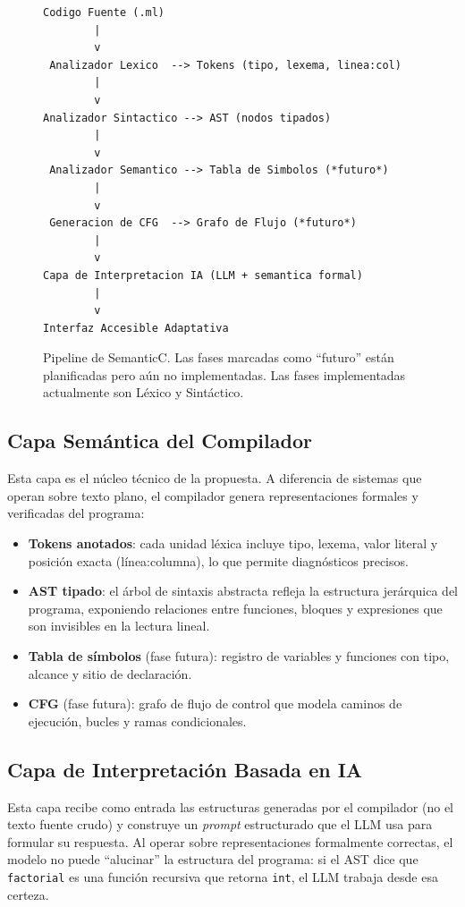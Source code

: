 \documentclass[conference]{IEEEtran}
\begin{document}
\begin{figure}[h]
\centering
\begin{lstlisting}[language={},frame=single,numbers=none,basicstyle=\ttfamily\scriptsize]
Codigo Fuente (.ml)
        |
        v
 Analizador Lexico  --> Tokens (tipo, lexema, linea:col)
        |
        v
Analizador Sintactico --> AST (nodos tipados)
        |
        v
 Analizador Semantico --> Tabla de Simbolos (*futuro*)
        |
        v
 Generacion de CFG  --> Grafo de Flujo (*futuro*)
        |
        v
Capa de Interpretacion IA (LLM + semantica formal)
        |
        v
Interfaz Accesible Adaptativa
\end{lstlisting}
\caption{Pipeline de SemanticC. Las fases marcadas como ``futuro'' están planificadas pero aún no implementadas. Las fases implementadas actualmente son Léxico y Sintáctico.}
\label{fig:arquitectura}
\end{figure}

\subsection{Capa Semántica del Compilador}
Esta capa es el núcleo técnico de la propuesta. A diferencia de sistemas que operan sobre texto plano, el compilador genera representaciones formales y verificadas del programa:
\begin{itemize}
    \item \textbf{Tokens anotados}: cada unidad léxica incluye tipo, lexema, valor literal y posición exacta (línea:columna), lo que permite diagnósticos precisos.
    \item \textbf{AST tipado}: el árbol de sintaxis abstracta refleja la estructura jerárquica del programa, exponiendo relaciones entre funciones, bloques y expresiones que son invisibles en la lectura lineal.
    \item \textbf{Tabla de símbolos} (fase futura): registro de variables y funciones con tipo, alcance y sitio de declaración.
    \item \textbf{CFG} (fase futura): grafo de flujo de control que modela caminos de ejecución, bucles y ramas condicionales.
\end{itemize}

\subsection{Capa de Interpretación Basada en IA}
Esta capa recibe como entrada las estructuras generadas por el compilador (no el texto fuente crudo) y construye un \textit{prompt} estructurado que el LLM usa para formular su respuesta. Al operar sobre representaciones formalmente correctas, el modelo no puede ``alucinar'' la estructura del programa: si el AST dice que \texttt{factorial} es una función recursiva que retorna \texttt{int}, el LLM trabaja desde esa certeza.
\end{document}
